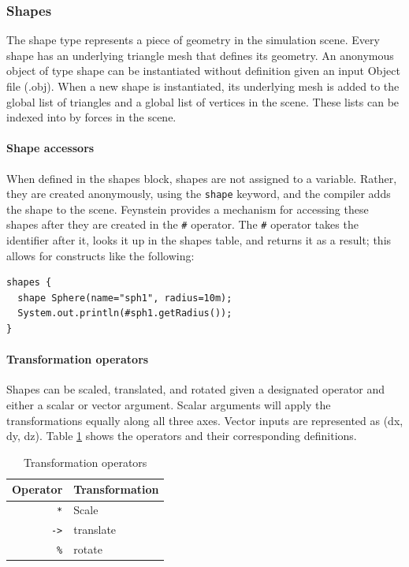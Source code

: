 \subsubsection{Shapes}
The shape type represents a piece of geometry in the simulation
scene. Every shape has an underlying triangle mesh that defines its
geometry. An anonymous object of type shape can be instantiated
without definition given an input Object file (.obj). When a new shape
is instantiated, its underlying mesh is added to the global list of
triangles and a global list of vertices in the scene. These lists can
be indexed into by forces in the scene.

\paragraph{Shape accessors}
When defined in the shapes block, shapes are not assigned to a
variable. Rather, they are created anonymously, using the
\texttt{shape} keyword, and the compiler adds the shape to the
scene. Feynstein provides a mechanism for accessing these shapes after
they are created in the \texttt{\#} operator. The \texttt{\#} operator
takes the identifier after it, looks it up in the shapes table, and
returns it as a result; this allows for constructs like the following:

\begin{verbatim}
shapes {
  shape Sphere(name="sph1", radius=10m);
  System.out.println(#sph1.getRadius());
}
\end{verbatim}

\paragraph{Transformation operators}
Shapes can be scaled, translated, and rotated given a designated
operator and either a scalar or vector argument. Scalar arguments will
apply the transformations equally along all three axes. Vector inputs
are represented as (dx, dy, dz). Table \ref{tab:transform} shows the
operators and their corresponding definitions.

\begin{table}[h]\centering
  \begin{tabular}{r|l}
    Operator & Transformation \\ \hline
    \texttt{*} & Scale \\
    \texttt{->} & translate \\
    \texttt{\%} & rotate \\
  \end{tabular}
  \caption{Transformation operators}
  \label{tab:transform}
\end{table}

